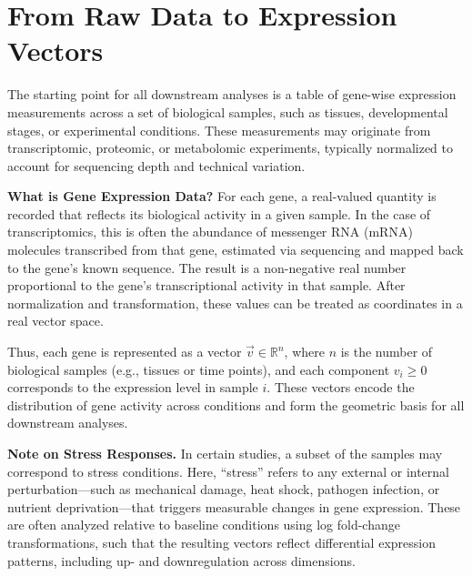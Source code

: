 \section{From Raw Data to Expression Vectors}

    The starting point for all downstream analyses is a table of gene-wise expression measurements across a set of biological samples, such as tissues, developmental stages, or experimental conditions. These measurements may originate from transcriptomic, proteomic, or metabolomic experiments, typically normalized to account for sequencing depth and technical variation.

    \noindent\textbf{What is Gene Expression Data?} For each gene, a real-valued quantity is recorded that reflects its biological activity in a given sample. In the case of transcriptomics, this is often the abundance of messenger RNA (mRNA) molecules transcribed from that gene, estimated via sequencing and mapped back to the gene's known sequence. The result is a non-negative real number proportional to the gene's transcriptional activity in that sample. After normalization and transformation, these values can be treated as coordinates in a real vector space.

    Thus, each gene is represented as a vector \( \vec{v} \in \mathbb{R}^n \), where \( n \) is the number of biological samples (e.g., tissues or time points), and each component \( v_i \geq 0 \) corresponds to the expression level in sample \( i \). These vectors encode the distribution of gene activity across conditions and form the geometric basis for all downstream analyses.

    \noindent\textbf{Note on Stress Responses.} In certain studies, a subset of the samples may correspond to stress conditions. Here, “stress” refers to any external or internal perturbation—such as mechanical damage, heat shock, pathogen infection, or nutrient deprivation—that triggers measurable changes in gene expression. These are often analyzed relative to baseline conditions using log fold-change transformations, such that the resulting vectors reflect differential expression patterns, including up- and downregulation across dimensions.